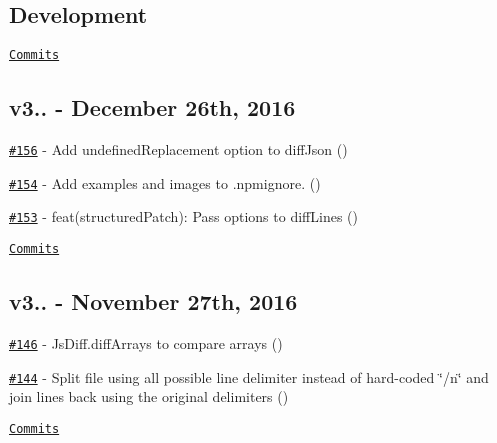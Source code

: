 \subsection*{Development}

\href{https://github.com/kpdecker/jsdiff/compare/v3.2.0...master}{\tt Commits}

\subsection*{v3.. -\/ December 26th, 2016}


\begin{DoxyItemize}
\item \href{https://github.com/kpdecker/jsdiff/pull/156}{\tt \#156} -\/ Add {\ttfamily undefined\+Replacement} option to {\ttfamily diff\+Json} (\href{https://api.github.com/users/ewnd9}{\tt })
\item \href{https://github.com/kpdecker/jsdiff/pull/154}{\tt \#154} -\/ Add {\ttfamily examples} and {\ttfamily images} to {\ttfamily .npmignore}. (\href{https://api.github.com/users/wtgtybhertgeghgtwtg}{\tt })
\item \href{https://github.com/kpdecker/jsdiff/pull/153}{\tt \#153} -\/ feat(structured\+Patch)\+: Pass options to diff\+Lines (\href{https://api.github.com/users/Kiougar}{\tt })
\end{DoxyItemize}

\href{https://github.com/kpdecker/jsdiff/compare/v3.1.0...v3.2.0}{\tt Commits}

\subsection*{v3.. -\/ November 27th, 2016}


\begin{DoxyItemize}
\item \href{https://github.com/kpdecker/jsdiff/pull/146}{\tt \#146} -\/ Js\+Diff.\+diff\+Arrays to compare arrays (\href{https://api.github.com/users/wvanderdeijl}{\tt })
\item \href{https://github.com/kpdecker/jsdiff/pull/144}{\tt \#144} -\/ Split file using all possible line delimiter instead of hard-\/coded \char`\"{}/n\char`\"{} and join lines back using the original delimiters (\href{https://api.github.com/users/soulbeing}{\tt })
\end{DoxyItemize}

\href{https://github.com/kpdecker/jsdiff/compare/v3.0.1...v3.1.0}{\tt Commits}

